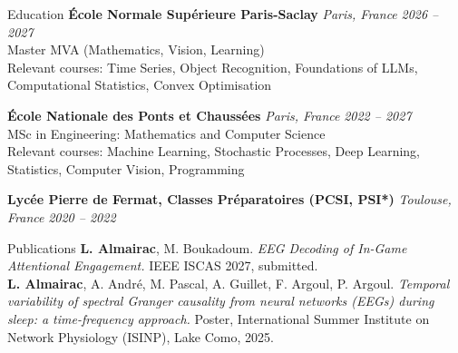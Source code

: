 \documentclass{resume} %
\begin{document}
\begin{rSection}{Education}
\vspace{0.1cm}
{\bf École Normale Supérieure Paris-Saclay} \raisebox{0.2ex}{\scriptsize \textbullet}
  {\em  \hspace{1em} Paris, France} \hfill {\em 2026 -- 2027}
\\ Master MVA (Mathematics, Vision, Learning)
\\ Relevant courses: \small{Time Series, Object Recognition, Foundations of LLMs, Computational Statistics, Convex Optimisation}

\normalsize
{\bf École Nationale des Ponts et Chaussées} \raisebox{0.2ex}{\scriptsize \textbullet}
  {\em  \hspace{1em} Paris, France} \hfill {\em  2022 -- 2027} 
\\ MSc in Engineering: Mathematics and Computer Science
\\ Relevant courses: \small{Machine Learning, Stochastic Processes, Deep Learning, Statistics, Computer Vision, Programming}

\normalsize
{\bf Lycée Pierre de Fermat, Classes Préparatoires (PCSI, PSI*)} \raisebox{0.2ex}{\scriptsize \textbullet}
  {\em  \hspace{1em} Toulouse, France} \hfill {\em 2020 -- 2022}



\end{rSection}

\begin{rSection}{Publications}
\vspace{0.1cm}
\textbf{L. Almairac}, M. Boukadoum. \textit{EEG Decoding of In-Game Attentional Engagement.} IEEE ISCAS 2027, submitted.\\
\textbf{L. Almairac}, A. André, M. Pascal, A. Guillet, F. Argoul, P. Argoul. \textit{Temporal variability of spectral Granger causality from neural networks (EEGs) during sleep: a time-frequency approach.} Poster, International Summer Institute on Network Physiology (ISINP), Lake Como, 2025.
\end{rSection}
\end{document}
